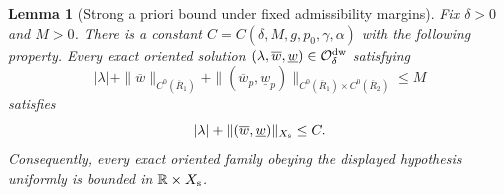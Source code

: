 \documentclass[11pt,reqno]{amsart}
\numberwithin{equation}{section}
\newtheorem{lemma}[theorem]{Lemma}
\theoremstyle{definition}
\theoremstyle{remark}
\begin{document}
\begin{lemma}[Strong a priori bound under fixed admissibility margins]
\label{lem6.1}
Fix $\delta>0$ and $M>0$.  There is a constant
$C=C(\delta,M,g,p_0,\gamma,\alpha)$ with the following property.
Every exact oriented solution
$(\lambda,\overline w,\underline w)\in
\mathcal O_\delta^{\rm dw}$ satisfying
\begin{equation}\label{eq6:lemma61-hypothesis}
 |\lambda|+\|\overline w\|_{C^0(\overline R_1)}
 +\|(\overline w_p,\underline w_p)\|_{C^0(\overline R_1)
 \times C^0(\overline R_2)}\le M
\end{equation}
satisfies
\begin{equation}\label{eq6:lemma61-conclusion}
 |\lambda|+
 \|(\overline w,\underline w)\|_{X_{\rm s}}\le C.
\end{equation}
Consequently, every exact oriented family obeying the displayed
hypothesis uniformly is bounded in $\mathbb R\times X_{\rm s}$.
\end{lemma}
\end{document}
